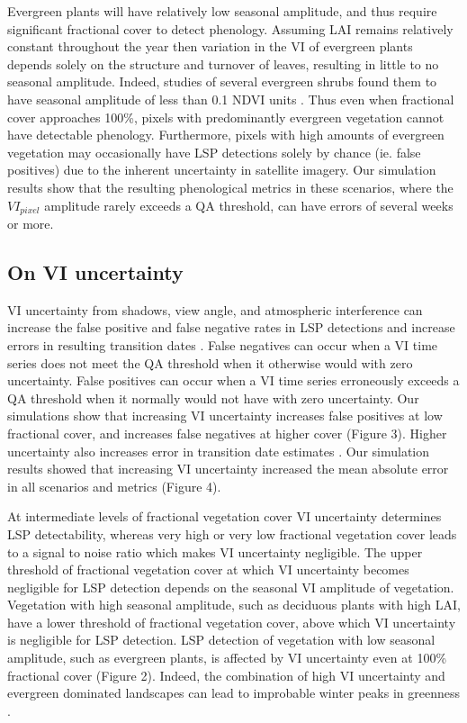 \documentclass{article}
\begin{document}
Evergreen plants will have relatively low seasonal amplitude, and thus require significant fractional cover to detect phenology. Assuming LAI remains relatively constant throughout the year then variation in the VI of evergreen plants depends solely on the structure and turnover of leaves, resulting in little to no seasonal amplitude. Indeed, studies of several evergreen shrubs found them to have seasonal amplitude of less than 0.1 NDVI units \cite{gamon1995, stylinski2002}. Thus even when fractional cover approaches 100\%, pixels with predominantly evergreen vegetation cannot have detectable phenology. Furthermore, pixels with high amounts of evergreen vegetation may occasionally have LSP detections solely by chance (ie. false positives) due to the inherent uncertainty in satellite imagery. Our simulation results show that the resulting phenological metrics in these scenarios, where the $VI_{pixel}$ amplitude rarely exceeds a QA threshold, can have errors of several weeks or more.

\subsection{On VI uncertainty}
VI uncertainty from shadows, view angle, and atmospheric interference can increase the false positive and false negative rates in LSP detections and increase errors in resulting transition dates \cite{ma2013}. False negatives can occur when a VI time series does not meet the QA threshold when it otherwise would with zero uncertainty. False positives can occur when a VI time series erroneously exceeds a QA threshold when it normally would not have with zero uncertainty. Our simulations show that increasing VI uncertainty increases false positives at low fractional cover, and increases false negatives at higher cover (Figure 3). Higher uncertainty also increases error in transition date estimates \cite{ma-huete2019}. Our simulation results showed that increasing VI uncertainty increased the mean absolute error in all scenarios and metrics (Figure 4).

At intermediate levels of fractional vegetation cover VI uncertainty determines LSP detectability, whereas very high or very low fractional vegetation cover leads to a signal to noise ratio which makes VI uncertainty negligible. The upper threshold of fractional vegetation cover at which VI uncertainty becomes negligible for LSP detection depends on the seasonal VI amplitude of vegetation. Vegetation with high seasonal amplitude, such as deciduous plants with high LAI, have a lower threshold of fractional vegetation cover, above which VI uncertainty is negligible for LSP detection. LSP detection of vegetation with low seasonal amplitude, such as evergreen plants, is affected by VI uncertainty even at 100\% fractional cover (Figure 2). Indeed, the combination of high VI uncertainty and evergreen dominated landscapes can lead to improbable winter peaks in greenness \cite{norris2020}. 
\end{document}
